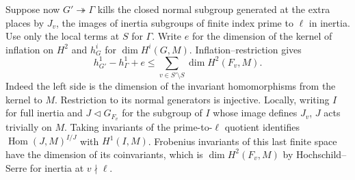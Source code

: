 \documentclass[11pt]{amsart}
\theoremstyle{definition}
\theoremstyle{remark}
\begin{document}
Suppose now $G'\twoheadrightarrow\Gamma$ kills the closed normal
subgroup generated at the extra places by $J_v$, the images of
inertia subgroups of finite index prime to $\ell$ in inertia.
Use only the local terms at $S$ for $\Gamma$. Write $e$ for the
dimension of the kernel of inflation on $H^2$ and $h^i_G$ for
$\dim H^i(G,M)$. Inflation--restriction gives
\[
 h^1_{G'}-h^1_\Gamma+e
 \le\sum_{v\in S'\setminus S}\dim H^2(F_v,M).
\]
Indeed the left side is the dimension of the invariant
homomorphisms from the kernel to $M$. Restriction to its normal
generators is injective. Locally, writing $I$ for full inertia
and $J\triangleleft G_{F_v}$ for the subgroup of $I$ whose image defines $J_v$,
$J$ acts trivially on $M$. Taking invariants of the prime-to-$\ell$
quotient identifies $\operatorname{Hom}(J,M)^{I/J}$ with
$H^1(I,M)$. Frobenius invariants of this last finite space have
the dimension of its coinvariants, which is $\dim H^2(F_v,M)$
by Hochschild--Serre for inertia at $v\nmid\ell$.
\end{document}
